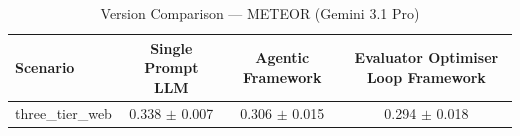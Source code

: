 \begin{table}[htbp]
\centering
\caption{Version Comparison — METEOR (Gemini 3.1 Pro)}
\label{tab:version_meteor_gemini}
\begin{tabular}{lccc}
\toprule
Scenario & Single Prompt LLM & Agentic Framework & Evaluator Optimiser Loop Framework \\
\midrule
three\_tier\_web & 0.338 $\pm$ 0.007 & 0.306 $\pm$ 0.015 & 0.294 $\pm$ 0.018 \\
\bottomrule
\end{tabular}
\end{table}